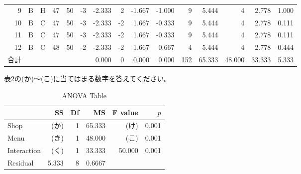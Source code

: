 \documentclass{ltjbook}
\begin{document}
\begin{landscape}
\begin{table}[ht]
\begin{tabular}{rllrrrrrrrrrrrr}
			9  & B    & H    & 47     & 50 & -3   & -2.333     & 2          & -1.667     & -1.000 & 9           & 5.444       & 4           & 2.778       & 1.000    \\
			10 & B    & C    & 47     & 50 & -3   & -2.333     & -2         & 1.667      & -0.333 & 9           & 5.444       & 4           & 2.778       & 0.111    \\
			11 & B    & C    & 47     & 50 & -3   & -2.333     & -2         & 1.667      & -0.333 & 9           & 5.444       & 4           & 2.778       & 0.111    \\
			12 & B    & C    & 48     & 50 & -2   & -2.333     & -2         & 1.667      & 0.667  & 4           & 5.444       & 4           & 2.778       & 0.444    \\\hline
			合計 &      &      &        &    &      & 0.000      & 0          & 0.000      & 0.000  & 152         & 65.333      & 48.000      & 33.333      & 5.333    \\\hline
		\end{tabular}
		\label{anovaExample2}
	\end{table}
\end{landscape}

表\ref{Example2Ans}の(か)〜(こ)に当てはまる数字を答えてください。

\begin{table}[ht]
	\centering
	\caption{ANOVA Table}
	\begin{tabular}{lrrrrr}
		\hline
		            & SS    & Df & MS     & F value & $p$   \\
		\hline
		Shop        & (か)   & 1  & 65.333 & (け)     & 0.001 \\
		Menu        & (き)   & 1  & 48.000 & (こ)     & 0.001 \\
		Interaction & (く)   & 1  & 33.333 & 50.000  & 0.001 \\
		Residual    & 5.333 & 8  & 0.6667 &         &       \\
		\hline
	\end{tabular}
	\label{Example2Ans}
\end{table}
\end{document}
